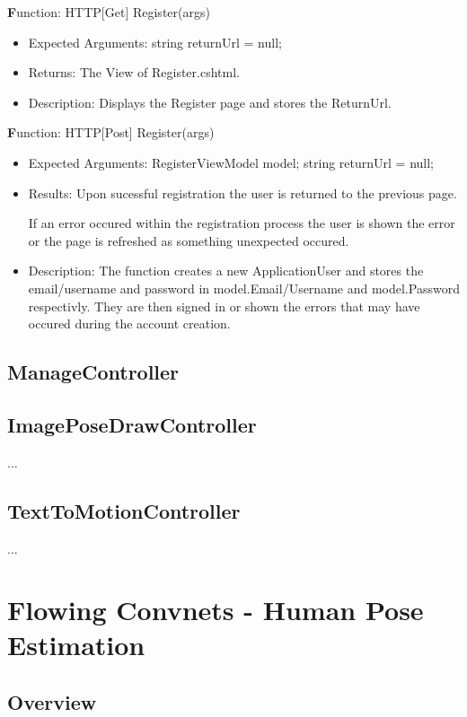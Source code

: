 \documentclass{scrreprt}
\begin{document}
  \textbf Function: HTTP[Get] Register(args)
  \begin{itemize}
    \item Expected Arguments:
    string returnUrl = null;
    \item Returns:
    The View of Register.cshtml.
    \item Description:
    Displays the Register page and stores the ReturnUrl.
  \end{itemize}

  \textbf Function: HTTP[Post] Register(args)
  \begin{itemize}
    \item Expected Arguments:
    RegisterViewModel model;
    string returnUrl = null;
    \item Results:
    Upon sucessful registration the user is returned to the previous page. 

    If an error occured within the registration process the user is shown the error or the page is refreshed as something unexpected occured.
    \item Description:
    The function creates a new ApplicationUser and stores the email/username and password in model.Email/Username and model.Password respectivly. They are then signed in or shown the errors that may have occured during the account creation.
  \end{itemize}

\subsection{ManageController}


\subsection{ImagePoseDrawController}

...

\subsection{TextToMotionController}

...

\break

\section{Flowing Convnets - Human Pose Estimation}

\subsection{Overview}
\end{document}
